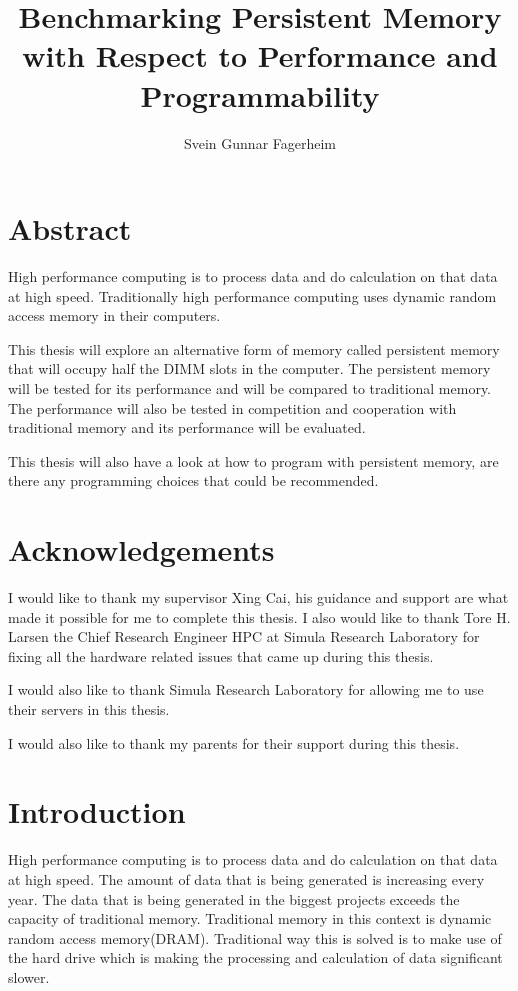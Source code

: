\documentclass[12pt,a4paper,USenglish]{article}      %
\title{Benchmarking Persistent Memory with Respect to Performance and Programmability}
\author{Svein Gunnar Fagerheim}
\begin{document}

\duoforside[dept={Institutt for informatikk}, program={Informatikk: Programming and System Architecture}, long]

\clearpage
\section{Abstract}
High performance computing is to process data and do calculation on that data at high speed. Traditionally high performance computing uses dynamic random access memory in their computers. 

This thesis will explore an alternative form of memory called persistent memory that will occupy half the DIMM slots in the computer. The persistent memory will be tested for its performance and will be compared to traditional memory. The performance will also be tested in competition and cooperation with traditional memory and its performance will be evaluated.

This thesis will also have a look at how to program with persistent memory, are there any programming choices that could be recommended.


\clearpage
\section{Acknowledgements}
I would like to thank my supervisor Xing Cai, his guidance and support are what made it possible for me to complete this thesis. I also would like to thank Tore H. Larsen the Chief Research Engineer HPC at Simula Research Laboratory for fixing all the hardware related issues that came up during this thesis.

I would also like to thank Simula Research Laboratory for allowing me to use their servers in this thesis.

I would also like to thank my parents for their support during this thesis.

\clearpage
\tableofcontents

\clearpage
\section{Introduction}
\label{Chapter:Introduction}
High performance computing is to process data and do calculation on that data at high speed. The amount of data that is being generated is increasing every year. The data that is being generated in the biggest projects exceeds the capacity of traditional memory. Traditional memory in this context is dynamic random access memory(DRAM).
Traditional way this is solved is to make use of the hard drive which is making the processing and calculation of data significant slower.
\end{document}
